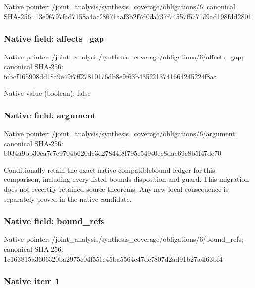 \documentclass[10pt,a4paper]{article}
\begin{document}
Native pointer: /joint\_analysis/synthesi\allowbreak{}s\_coverage/obligations/6; canonical SHA-256: 13e96797fad7158a4ac28671\allowbreak{}aaf3b2f7d0da737f74557f57\allowbreak{}71d9ad198fdd2801



\subsubsection{Native field: affects\_gap}


Native pointer: /joint\_analysis/synthesi\allowbreak{}s\_coverage/obligations/6\allowbreak{}/affects\_gap; canonical SHA-256: fcbcf165908dd18a9e49f7ff\allowbreak{}27810176db8e9f63b4352213\allowbreak{}741664245224f8aa



Native value (boolean): false



\subsubsection{Native field: argument}


Native pointer: /joint\_analysis/synthesi\allowbreak{}s\_coverage/obligations/6\allowbreak{}/argument; canonical SHA-256: b034a9bb30ea7c7c9704b620\allowbreak{}dc3d27844f8f795e54940ec8\allowbreak{}dac69c8b5f47de70


Conditionally retain the exact native compatiblebound ledger for this comparison, including every listed bounds disposition and guard. This migration does not recertify retained source theorems. Any new local consequence is separately proved in the native candidate.


\subsubsection{Native field: bound\_refs}


Native pointer: /joint\_analysis/synthesi\allowbreak{}s\_coverage/obligations/6\allowbreak{}/bound\_refs; canonical SHA-256: 1c163815a3606320ba2975c0\allowbreak{}4f550e45ba5564c47dc7807d\allowbreak{}2ad91b27a4f63bf4



\subsubsection{Native item 1}
\end{document}
